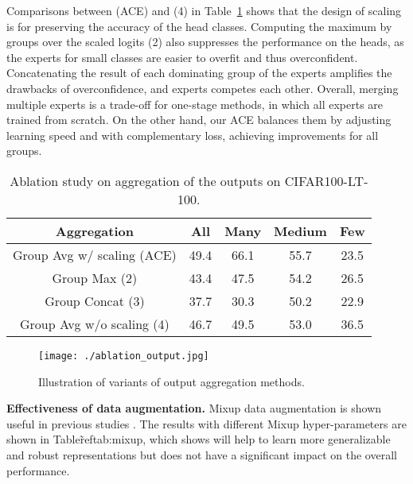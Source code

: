\documentclass[10pt,twocolumn,letterpaper]{article}
\begin{document}
Comparisons between (ACE) and (4) in Table~\ref{tab:abs-agg} shows that the design of scaling is for preserving the accuracy of the head classes. Computing the maximum by groups over the scaled logits (2) also suppresses the performance on the heads, as the experts for small classes are easier to overfit and thus overconfident. Concatenating the result of each dominating group of the experts amplifies the drawbacks of overconfidence, and experts competes each other. Overall, merging multiple experts is a trade-off for one-stage methods, in which all experts are trained from scratch. On the other hand, our ACE balances them by adjusting learning speed and with complementary loss, achieving improvements for all groups. 

\begin{table}[h]
\begin{center}
\small
\begin{tabular}{c|c|c c c}
\toprule[1.5pt]
\textbf{Aggregation} &  \textbf{All} & \textbf{Many} & \textbf{Medium} & \textbf{Few}\\\hline\hline
Group Avg w/ scaling (ACE) &  49.4 & 66.1 & 55.7 & 23.5\\
Group Max (2) &  43.4 & 47.5 & 54.2 & 26.5 \\
Group Concat (3)   & 37.7 &  30.3 & 50.2 & 22.9 \\
Group Avg w/o scaling (4)  & 46.7 & 49.5  &53.0 & 36.5\\
\bottomrule[1.5pt]
\end{tabular}
\end{center}
\caption{Ablation study on aggregation of the outputs on CIFAR100-LT-100.}
\label{tab:abs-agg}
\end{table}

\begin{figure}
\begin{center}
\texttt{[image: ./ablation\_output.jpg]}
\end{center}
   \caption{Illustration of variants of output aggregation methods.}
\label{fig:abl-out}
\end{figure}

\textbf{Effectiveness of data augmentation.} Mixup data augmentation is shown useful in previous studies \cite{zhou2020bbn, chou2020remix, zhang2021bag}. The results with different Mixup hyper-parameters  are shown in Table\~ref{tab:mixup}, which shows  will help to learn more generalizable and robust representations but does not have a significant impact on the overall performance.
\end{document}
